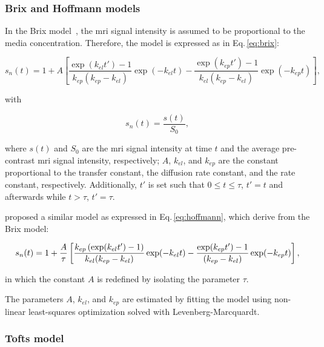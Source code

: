\subsubsection{Brix and Hoffmann models}\label{sec:brixhoffmann}

In the Brix model~\citep{brix1991pharmacokinetic}, the \ac{mri} signal intensity is assumed to be proportional to the media concentration.
Therefore, the model is expressed as in Eq.\,\eqref{eq:brix}:

\begin{equation}
  s_n(t) = 1 + A \left[ \frac{\exp(k_{el} t') - 1}{k_{ep}(k_{ep} - k_{el})} \exp(- k_{el} t) - \frac{\exp(k_{ep} t') - 1}{k_{el}(k_{ep} - k_{el})} \exp(- k_{ep} t) \right],
  \label{eq:brix}
\end{equation}

\noindent with

\begin{equation}
  s_n(t) = \frac{s(t)}{S_0},
  \label{eq:enh}
\end{equation}

\noindent where $s(t)$ and $S_0$ are the \ac{mri} signal intensity at time $t$ and the average pre-contrast \ac{mri} signal intensity, respectively; $A$, $k_{el}$, and $k_{ep}$ are the constant proportional to the transfer constant, the diffusion rate constant, and the rate constant, respectively.
Additionally, $t'$ is set such that $0 \leq t \leq \tau$, $t' = t$ and afterwards while $t > \tau$, $t' = \tau$.

\citeauthor{hoffmann1995pharmacokinetic} proposed a similar model as expressed in Eq.\,\eqref{eq:hoffmann}, which derive from the Brix model:

\begin{equation}
  \small
  s_n(t) = 1 + \frac{A}{\tau} \left[ \frac{k_{ep} \left( \exp(k_{el} t') - 1 \right)}{k_{el}(k_{ep} - k_{el})} \exp(- k_{el} t) - \frac{\exp(k_{ep} t') - 1}{(k_{ep} - k_{el})} \exp(- k_{ep} t) \right] ,
  \label{eq:hoffmann}
\end{equation}

\noindent in which the constant $A$ is redefined by isolating the parameter $\tau$.

The parameters $A$, $k_{el}$, and $k_{ep}$ are estimated by fitting the model using non-linear least-squares optimization solved with Levenberg-Marcquardt.

\subsubsection{Tofts model}\label{sec:tofts}

